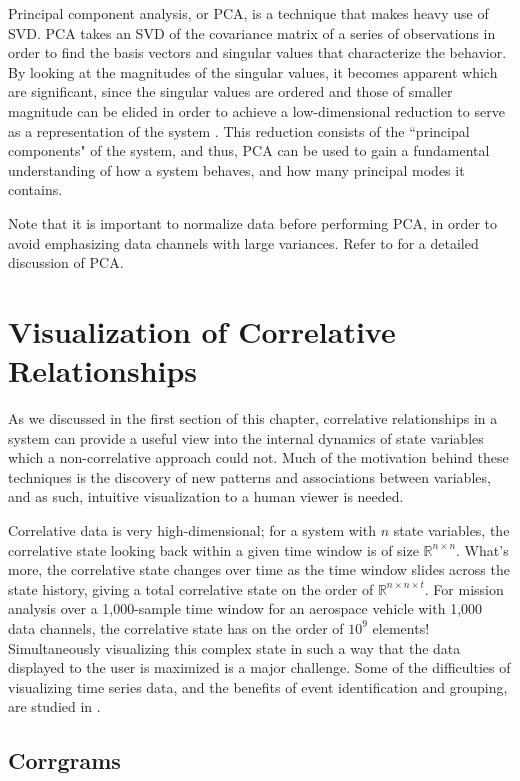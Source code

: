 Principal component analysis, or PCA, is a technique that makes heavy use of SVD. PCA takes an SVD of the covariance matrix of a series of observations in order to find the basis vectors and singular values that characterize the behavior. By looking at the magnitudes of the singular values, it becomes apparent which are significant, since the singular values are ordered and those of smaller magnitude can be elided in order to achieve a low-dimensional reduction to serve as a representation of the system \cite{kutz2013data}. This reduction consists of the ``principal components" of the system, and thus, PCA can be used to gain a fundamental understanding of how a system behaves, and how many principal modes it contains.

Note that it is important to normalize data before performing PCA, in order to avoid emphasizing data channels with large variances. Refer to \cite{shlens2014tutorial} for a detailed discussion of PCA.


\section{Visualization of Correlative Relationships}

As we discussed in the first section of this chapter, correlative relationships in a system can provide a useful view into the internal dynamics of state variables which a non-correlative approach could not. Much of the motivation behind these techniques is the discovery of new patterns and associations between variables, and as such, intuitive visualization to a human viewer is needed.

Correlative data is very high-dimensional; for a system with $n$ state variables, the correlative state looking back within a given time window is of size $\mathbb{R}^{n \times n}$. What's more, the correlative state changes over time as the time window slides across the state history, giving a total correlative state on the order of $\mathbb{R}^{n \times n \times t}$. For mission analysis over a 1,000-sample time window for an aerospace vehicle with 1,000 data channels, the correlative state has on the order of $10^{9}$ elements! Simultaneously visualizing this complex state in such a way that the data displayed to the user is maximized is a major challenge. Some of the difficulties of visualizing time series data, and the benefits of event identification and grouping, are studied in \cite{muller2003visualization}.

\subsection{Corrgrams}

